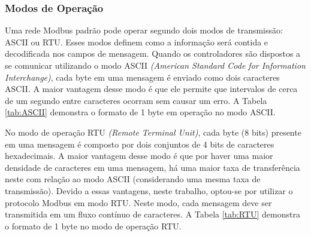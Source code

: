 \subsubsection{Modos de Operação}

Uma rede Modbus padrão pode operar segundo dois modos de transmissão: ASCII ou RTU. Esses modos definem como a informação será contida e decodificada nos campos de mensagem. Quando os controladores são dispostos a se comunicar utilizando o modo ASCII \textit{(American Standard Code for Information Interchange)}, cada byte em uma mensagem é enviado como dois caracteres ASCII. A maior vantagem desse modo é que ele permite que intervalos de cerca de um segundo entre caracteres ocorram sem causar um erro. A Tabela \ref{tab:ASCII} demonstra o formato de 1 byte em operação no modo ASCII.

\begin{table}[]
\centering
{}
\caption{Formato de Byte no Modo ASCII}
\label{tab:ASCII}
\end{table}


No modo de operação RTU \textit{(Remote Terminal Unit)}, cada byte (8 bits) presente em uma mensagem é composto por dois conjuntos de 4 bits de caracteres hexadecimais. A maior vantagem desse modo é que por haver uma maior densidade de caracteres em uma mensagem, há uma maior taxa de transferência neste com relação ao modo ASCII (considerando uma mesma taxa de transmissão). Devido a essas vantagens, 
neste trabalho, optou-se por utilizar o protocolo Modbus em modo RTU. Neste modo, cada mensagem deve ser transmitida em um fluxo contínuo de caracteres. A Tabela \ref{tab:RTU} demonstra o formato de 1 byte no modo de operação RTU.


